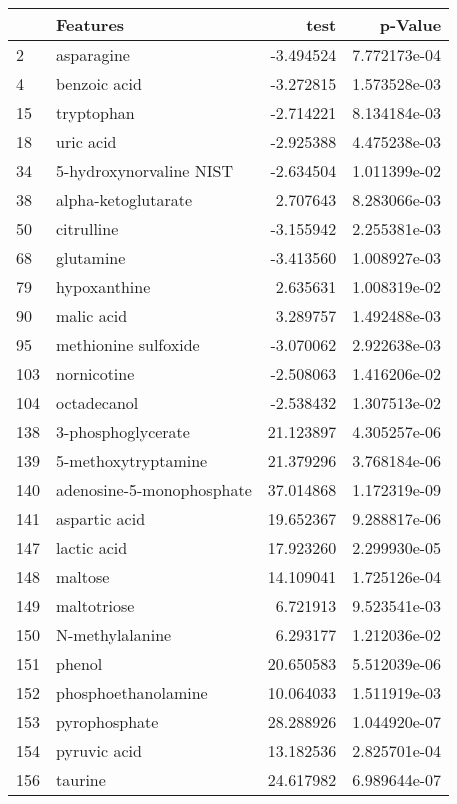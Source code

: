 \begin{tabular}{llrr}
\toprule
{} &                   Features &       test &       p-Value \\
\midrule
2   &                 asparagine &  -3.494524 &  7.772173e-04 \\
4   &               benzoic acid &  -3.272815 &  1.573528e-03 \\
15  &                 tryptophan &  -2.714221 &  8.134184e-03 \\
18  &                  uric acid &  -2.925388 &  4.475238e-03 \\
34  &    5-hydroxynorvaline NIST &  -2.634504 &  1.011399e-02 \\
38  &        alpha-ketoglutarate &   2.707643 &  8.283066e-03 \\
50  &                 citrulline &  -3.155942 &  2.255381e-03 \\
68  &                  glutamine &  -3.413560 &  1.008927e-03 \\
79  &               hypoxanthine &   2.635631 &  1.008319e-02 \\
90  &                 malic acid &   3.289757 &  1.492488e-03 \\
95  &       methionine sulfoxide &  -3.070062 &  2.922638e-03 \\
103 &                nornicotine &  -2.508063 &  1.416206e-02 \\
104 &                octadecanol &  -2.538432 &  1.307513e-02 \\
138 &         3-phosphoglycerate &  21.123897 &  4.305257e-06 \\
139 &        5-methoxytryptamine &  21.379296 &  3.768184e-06 \\
140 &  adenosine-5-monophosphate &  37.014868 &  1.172319e-09 \\
141 &              aspartic acid &  19.652367 &  9.288817e-06 \\
147 &                lactic acid &  17.923260 &  2.299930e-05 \\
148 &                    maltose &  14.109041 &  1.725126e-04 \\
149 &                maltotriose &   6.721913 &  9.523541e-03 \\
150 &            N-methylalanine &   6.293177 &  1.212036e-02 \\
151 &                     phenol &  20.650583 &  5.512039e-06 \\
152 &        phosphoethanolamine &  10.064033 &  1.511919e-03 \\
153 &              pyrophosphate &  28.288926 &  1.044920e-07 \\
154 &               pyruvic acid &  13.182536 &  2.825701e-04 \\
156 &                    taurine &  24.617982 &  6.989644e-07 \\
\bottomrule
\end{tabular}
